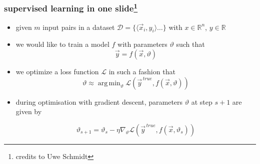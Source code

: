 \documentclass[
  aspectratio=1610, %
  intlimits %
]{beamer}
\DeclareMathOperator*{\argmin}{arg\,min}
\begin{document}
\begin{frame}
  \frametitle{supervised learning in one slide\footnote{credits to Uwe Schmidt}}
  \vfill
  \begin{exampleblock}{}
   \begin{itemize}
   \item given $m$ input pairs in a dataset $\mathcal{D} = \{\langle \vec{x}_i, y_i\rangle \dots \}$ with $x \in \mathbb{R}^n$, $y \in \mathbb{R}$
   \item we would like to train a model $f$ with parameters $\vartheta$ such that
     \begin{equation*}
     \vec{y} = f(\vec{x}, \vartheta)
   \end{equation*}
   \item we optimize a loss function $\mathcal{L}$ in such a fashion that
     \begin{equation*}
     \vartheta \approx \argmin_{\vartheta} \mathcal{L}( \vec{y}^{\,true}, f(\vec{x}, \vartheta) )
   \end{equation*}
   \item during optimisation with gradient descent, parameters $\vartheta$ at step $s+1$ are given by

     \begin{equation*}
\vartheta_{s+1} = \vartheta_{s} - \eta \nabla_{\vartheta}\mathcal{L}( \vec{y}^{\,true}, f(\vec{x}, \vartheta_{s}))
\end{equation*}

   \end{itemize}
 \end{exampleblock}
  \vfill

\end{frame}
\end{document}
